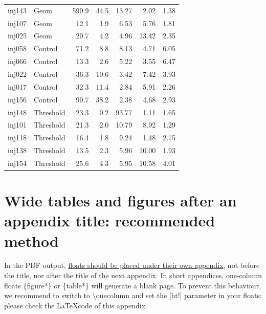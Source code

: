 \documentclass{aa}
\begin{document}
\begin{appendix}
\begin{table}[ht!]
\begin{tabular}{llrrrrr}
inj143 & Geom & 590.9 & 44.5 & 13.27 & 2.02 & 1.38 \\
inj107 & Geom & 12.1 & 1.9 & 6.53 & 5.76 & 1.81 \\
inj025 & Geom & 20.7 & 4.2 & 4.96 & 13.42 & 2.35 \\
\noalign{\smallskip}
inj058 & Control & 71.2 & 8.8 & 8.13 & 4.71 & 6.05 \\
inj066 & Control & 13.3 & 2.6 & 5.22 & 3.55 & 6.47 \\
inj022 & Control & 36.3 & 10.6 & 3.42 & 7.42 & 3.93 \\
inj017 & Control & 32.3 & 11.4 & 2.84 & 5.91 & 2.26 \\
inj156 & Control & 90.7 & 38.2 & 2.38 & 4.68 & 2.93 \\
\noalign{\smallskip}
inj148 & Threshold & 23.3 & 0.2 & 93.77 & 1.11 & 1.65 \\
inj101 & Threshold & 21.3 & 2.0 & 10.79 & 8.92 & 1.29 \\
inj118 & Threshold & 16.4 & 1.8 & 9.24 & 1.48 & 2.75 \\
inj138 & Threshold & 13.5 & 2.3 & 5.96 & 10.00 & 1.93 \\
inj154 & Threshold & 25.6 & 4.3 & 5.95 & 10.58 & 4.01 \\
\hline
\end{tabular}
\end{table}


\FloatBarrier %
\twocolumn














\onecolumn
\section{Wide tables and figures after an appendix title: recommended method}
%

In the PDF output, \underline{floats should be placed
under their own appendix}, not before the title, nor after the
title of the next appendix. In short appendices, one-column floats
\{figure*\} or \{table*\} will generate
a blank page. To prevent this behaviour, we recommend to switch
to \textbackslash onecolumn and set the [ht!] parameter 
in your floats: please check the \LaTeX code of this appendix.\\


\end{appendix}
\end{document}
